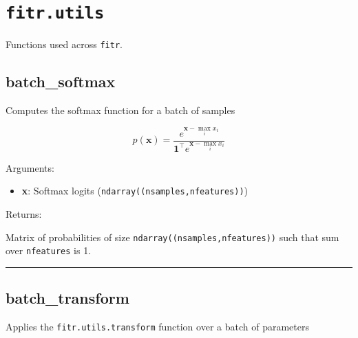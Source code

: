 \section{\texorpdfstring{\texttt{fitr.utils}}{fitr.utils}}\label{fitr.utils}

Functions used across \texttt{fitr}.

\subsection{batch\_softmax}\label{batch_softmax}

\begin{Shaded}
\begin{Highlighting}[]
\OperatorTok{=}\NormalTok{)}
\end{Highlighting}
\end{Shaded}

Computes the softmax function for a batch of samples

\[
p(\mathbf{x}) = \frac{e^{\mathbf{x} - \max_i x_i}}{\mathbf{1}^\top e^{\mathbf{x} - \max_i x_i}}
\]

Arguments:

\begin{itemize}
\tightlist
\item
  \textbf{x}: Softmax logits (\texttt{ndarray((nsamples,nfeatures))})
\end{itemize}

Returns:

Matrix of probabilities of size \texttt{ndarray((nsamples,nfeatures))}
such that sum over \texttt{nfeatures} is 1.

\begin{center}\rule{0.5\linewidth}{\linethickness}\end{center}

\subsection{batch\_transform}\label{batch_transform}

\begin{Shaded}
\begin{Highlighting}[]
\end{Highlighting}
\end{Shaded}

Applies the \texttt{fitr.utils.transform} function over a batch of
parameters

